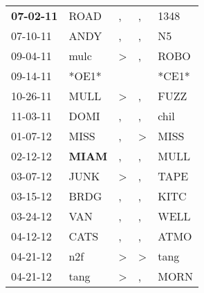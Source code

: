 \begin{supertabular}{p{0.07\textwidth}p{0.06\textwidth}p{0.02\textwidth}p{0.02\textwidth}p{0.06\textwidth}}
 \textbf{07-02-11\textsuperscript{}} &           ROAD\textsuperscript{} &                , &                , &           1348\textsuperscript{} \\
          07-10-11\textsuperscript{} &           ANDY\textsuperscript{} &                , &                , &             N5\textsuperscript{} \\
          09-04-11\textsuperscript{} &           mulc\textsuperscript{} &     \textgreater &                , &           ROBO\textsuperscript{} \\
          09-14-11\textsuperscript{} &                            *OE1* &                  &                  &                            *CE1* \\
          10-26-11\textsuperscript{} &           MULL\textsuperscript{} &     \textgreater &                , &           FUZZ\textsuperscript{} \\
          11-03-11\textsuperscript{} &           DOMI\textsuperscript{} &                , &                , &           chil\textsuperscript{} \\
          01-07-12\textsuperscript{} &           MISS\textsuperscript{} &                , &     \textgreater &           MISS\textsuperscript{} \\
          02-12-12\textsuperscript{} &  \textbf{MIAM\textsuperscript{}} &                , &                , &           MULL\textsuperscript{} \\
          03-07-12\textsuperscript{} &           JUNK\textsuperscript{} &     \textgreater &                , &           TAPE\textsuperscript{} \\
          03-15-12\textsuperscript{} &           BRDG\textsuperscript{} &                , &                , &           KITC\textsuperscript{} \\
          03-24-12\textsuperscript{} &            VAN\textsuperscript{} &                , &                , &           WELL\textsuperscript{} \\
          04-12-12\textsuperscript{} &           CATS\textsuperscript{} &                , &                , &           ATMO\textsuperscript{} \\
          04-21-12\textsuperscript{} &            n2f\textsuperscript{} &     \textgreater &     \textgreater &           tang\textsuperscript{} \\
          04-21-12\textsuperscript{} &           tang\textsuperscript{} &     \textgreater &                , &           MORN\textsuperscript{} \\

\end{supertabular}
